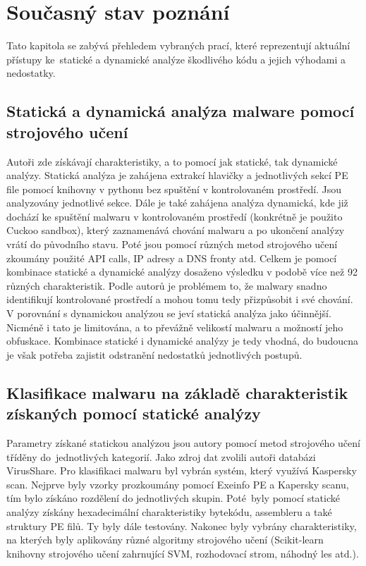 \section{Současný stav poznání}
\label{stateOfArt}

Tato kapitola se zabývá přehledem vybraných prací, které reprezentují aktuální přístupy ke~statické a dynamické analýze škodlivého kódu a jejich výhodami a nedostatky.

\subsection{Statická a dynamická analýza malware pomocí strojového učení}
\label{stateofArt1_staticanddynamic_machinelearning}

Autoři \cite{stateOfArt1} zde získávají charakteristiky, a to pomocí jak statické, tak dynamické analýzy. Statická analýza je zahájena extrakcí hlavičky a jednotlivých sekcí PE file pomocí knihovny v pythonu bez spuštění v kontrolovaném prostředí. Jsou analyzovány jednotlivé sekce. Dále je také zahájena analýza dynamická, kde již dochází ke spuštění malwaru v kontrolovaném prostředí (konkrétně je použito Cuckoo sandbox), který zaznamenává chování malwaru a po ukončení analýzy vrátí do původního stavu. Poté jsou pomocí různých metod strojového učení zkoumány použité API calls, IP adresy a DNS fronty atd. Celkem je pomocí kombinace statické a dynamické analýzy dosaženo výsledku v podobě více než 92 různých charakteristik. Podle autorů je problémem to, že malwary snadno identifikují kontrolované prostředí a mohou tomu tedy přizpůsobit i své chování. V porovnání s dynamickou analýzou se jeví statická analýza jako účinnější. Nicméně i tato je limitována, a to převážně velikostí malwaru a možností jeho obfuskace. Kombinace statické i dynamické analýzy je tedy vhodná, do budoucna je však potřeba zajistit odstranění nedostatků jednotlivých postupů.

\subsection{Klasifikace malwaru na základě charakteristik získaných pomocí statické analýzy}
\label{stateofArt2_characteristics_classification}

Parametry získané statickou analýzou jsou autory \cite{stateOfArt2} pomocí metod strojového učení tříděny do~jednotlivých kategorií. Jako zdroj dat zvolili autoři databázi VirusShare. Pro klasifikaci malwaru byl vybrán systém, který využívá Kaspersky scan. Nejprve byly vzorky prozkoumány pomocí Exeinfo PE a Kapersky scanu, tím bylo získáno rozdělení do jednotlivých skupin. Poté~byly pomocí statické analýzy získány hexadecimální charakteristiky bytekódu, assembleru a také struktury PE filů. Ty byly dále testovány. Nakonec byly vybrány charakteristiky, na kterých byly aplikovány různé algoritmy strojového učení (Scikit-learn knihovny strojového učení zahrnující SVM, rozhodovací strom, náhodný les atd.). 

